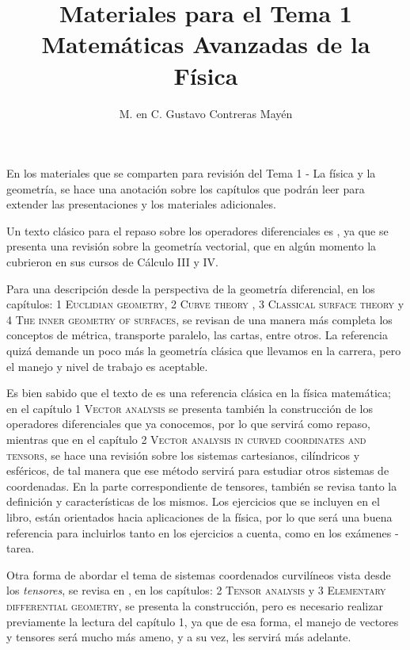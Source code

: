 
\usepackage{apacite}
\renewcommand{\refname}{Bibliografía.}
\title{Materiales para el Tema 1\\ \large{Matemáticas Avanzadas de la Física}\vspace{-3ex}}
\author{M. en C. Gustavo Contreras Mayén}
\date{ }

\vspace{-4cm}
\maketitle
\fontsize{14}{14}\selectfont
En los materiales que se comparten para revisión del Tema 1 - La física y la geometría, se hace una anotación sobre los capítulos que podrán leer para extender las presentaciones y los materiales adicionales.
\par
Un texto clásico para el repaso sobre los operadores diferenciales es \cite{Schey2005}, ya que se presenta una revisión sobre la geometría vectorial, que en algún momento la cubrieron en sus cursos de Cálculo III y IV. 
\par
Para una descripción desde la perspectiva de la geometría diferencial, en \cite{Bar2010} los capítulos: 1 \textsc{Euclidian geometry}, 2 \textsc{Curve theory} , 3 \textsc{Classical surface theory} y 4 \textsc{The inner geometry of surfaces}, se revisan de una manera más completa los conceptos de métrica, transporte paralelo, las cartas, entre otros. La referencia quizá demande un poco más la geometría clásica que llevamos en la carrera, pero el manejo y nivel de trabajo es aceptable.
\par
Es bien sabido que el texto de \cite{Arfken2006} es una referencia clásica en la física matemática; en el capítulo 1 \textsc{Vector analysis} se presenta también la construcción de los operadores diferenciales que ya conocemos, por lo que servirá como repaso, mientras que en el capítulo 2 \textsc{Vector analysis in curved coordinates and tensors}, se hace una revisión sobre los sistemas cartesianos, cilíndricos y esféricos, de tal manera que ese método servirá para estudiar otros sistemas de coordenadas. En la parte correspondiente de tensores, también se revisa tanto la definición y características de los mismos. Los ejercicios que se incluyen en el libro, están orientados hacia aplicaciones de la física, por lo que será una buena referencia para incluirlos tanto en los ejercicios a cuenta, como en los exámenes - tarea.
\par
Otra forma de abordar el tema de sistemas coordenados curvilíneos vista desde los \emph{tensores}, se revisa en \cite{Nguyen2017}, en los capítulos: 2 \textsc{Tensor analysis} y 3 \textsc{Elementary differential geometry}, se presenta la construcción, pero es necesario realizar previamente la lectura del capítulo 1, ya que de esa forma, el manejo de vectores y tensores será mucho más ameno, y a su vez, les servirá más adelante.
